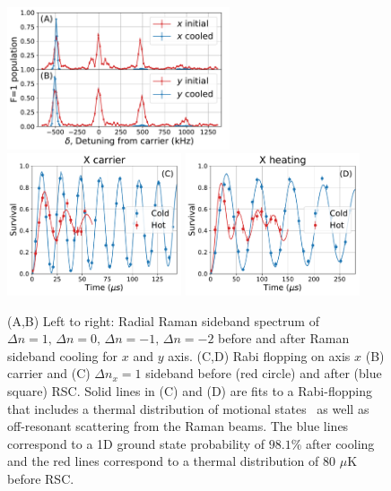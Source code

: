 \documentclass[aps,prl,twocolumn,groupedaddress]{revtex4-1}
\begin{document}
\begin{figure}
  \includegraphics[height=4.2cm]{spectrum_r.pdf}
  \includegraphics[height=4.2cm]{rabi_flop_rx_0.pdf}
  \includegraphics[height=4.2cm]{rabi_flop_rx_p1.pdf}
  \caption{(A,B) Left to right: Radial Raman sideband spectrum of $\Delta n=1,\,\Delta n=0,\,\Delta n=-1,\,\Delta n=-2$ before and after Raman sideband cooling for $x$ and $y$ axis.
    (C,D) Rabi flopping on axis $x$ (B) carrier and (C) $\Delta n_x=1$ sideband
    before (red circle) and after (blue square) RSC.
    Solid lines in (C) and (D) are fits to a Rabi-flopping
    that includes a thermal distribution of motional states~\cite{Meekhof1996}
    as well as off-resonant scattering from the Raman beams.
    The blue lines correspond to a 1D ground state probability of $98.1$\% after cooling
    and the red lines correspond to a thermal distribution of $80$ $\mu$K before RSC.
    \label{f-radial}}
\end{figure}
\end{document}
